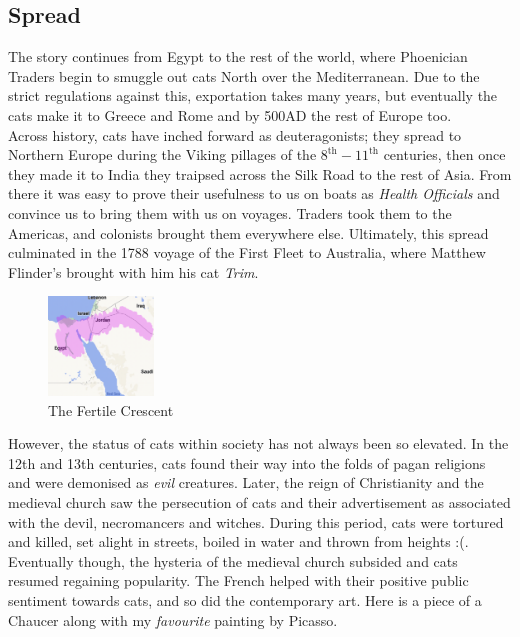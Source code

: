 \documentclass{article}
\begin{document}
\subsection*{Spread}

The story continues from Egypt to the rest of the world, where Phoenician Traders begin to smuggle out cats North over the Mediterranean. Due to the strict regulations against this, exportation takes many years, but eventually the cats make it to Greece and Rome and by 500AD the rest of Europe too.\\

Across history, cats have inched forward as deuteragonists; they spread to Northern Europe during the Viking pillages of the \(8^{\text{th}} - 11^{\text{th}}\) centuries, then once they made it to India they traipsed across the Silk Road to the rest of Asia. From there it was easy to prove their usefulness to us on boats as \emph{Health Officials} and convince us to bring them with us on voyages. Traders took them to the Americas, and colonists brought them everywhere else. Ultimately, this spread culminated in the 1788 voyage of the First Fleet to Australia, where Matthew Flinder's brought with him his cat \emph{Trim}.\\

\begin{figure}
    \includegraphics[width=0.25\textwidth]{img/crescent.png}
    \caption{The Fertile Crescent}
\end{figure}


However, the status of cats within society has not always been so elevated. In the 12th and 13th centuries, cats found their way into the folds of pagan religions and were demonised as \emph{evil} creatures. Later, the reign of Christianity and the medieval church saw the persecution of cats and their advertisement as associated with the devil, necromancers and witches. During this period, cats were tortured and killed, set alight in streets, boiled in water and thrown from heights :(.\\

Eventually though, the hysteria of the medieval church subsided and cats resumed regaining popularity. The French helped with their positive public sentiment towards cats, and so did the contemporary art. Here is a piece of a Chaucer along with my \emph{favourite} painting by Picasso.\\\\
\end{document}
